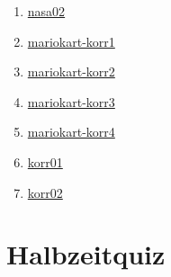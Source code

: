 \documentclass[
  letterpaper,
]{scrbook}
\providecommand{\tightlist}{%
  \setlength{\itemsep}{0pt}\setlength{\parskip}{0pt}}\usepackage{longtable,booktabs,array}
\theoremstyle{definition}
\theoremstyle{definition}
\theoremstyle{definition}
\theoremstyle{remark}
\begin{document}
\begin{enumerate}
\def\labelenumi{\arabic{enumi}.}
\tightlist
\item
  \href{https://sebastiansauer.github.io/Datenwerk/posts/nasa02/nasa02.html}{nasa02}
\item
  \href{https://sebastiansauer.github.io/Datenwerk/posts/mariokart-korr1/mariokart-korr1.html}{mariokart-korr1}
\item
  \href{https://sebastiansauer.github.io/Datenwerk/posts/mariokart-korr2/mariokart-korr2.html}{mariokart-korr2}
\item
  \href{https://sebastiansauer.github.io/Datenwerk/posts/mariokart-korr3/mariokart-korr3.html}{mariokart-korr3}
\item
  \href{https://sebastiansauer.github.io/Datenwerk/posts/mariokart-korr4/mariokart-korr4.html}{mariokart-korr4}
\item
  \href{https://sebastiansauer.github.io/Datenwerk/posts/korr01/korr01.html}{korr01}
\item
  \href{https://sebastiansauer.github.io/Datenwerk/posts/korr02/korr02.html}{korr02}
\end{enumerate}

\section{Halbzeitquiz}\label{halbzeitquiz}
\end{document}
